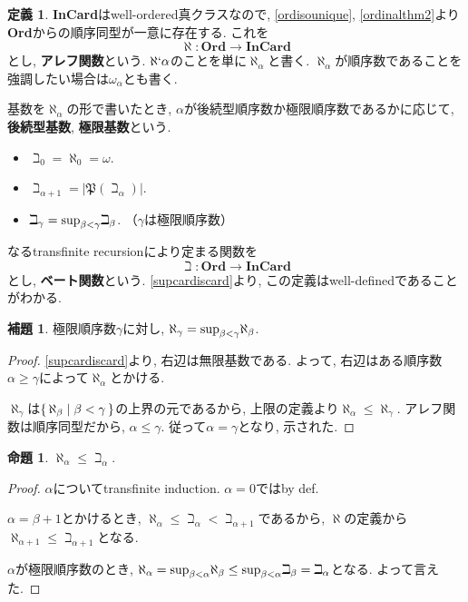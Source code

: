 \documentclass[a4paper, twoside]{bxjsarticle}
\newcommand{\abs}[1]{\left\lvert#1\right\rvert}
\theoremstyle{definition}
\newtheorem{prop}[thm]{命題}
\newtheorem{defn}[thm]{定義}
\newtheorem{lem}[thm]{補題}
\begin{document}
        \begin{defn}
            \textbf{InCard}はwell-ordered真クラスなので, \ref{ordisounique}, \ref{ordinalthm2}より\textbf{Ord}からの順序同型が一意に存在する. これを\[\aleph\colon \textbf{Ord}\to\textbf{InCard}\]とし, \textbf{アレフ関数}という. $\aleph`\alpha$のことを単に$\aleph_\alpha$と書く. $\aleph_\alpha$が順序数であることを強調したい場合は$\omega_\alpha$とも書く. 
            
            基数を$\aleph_\alpha$の形で書いたとき, $\alpha$が後続型順序数か極限順序数であるかに応じて, \textbf{後続型基数}, \textbf{極限基数}という.
            
            \begin{itemize}
                \item $\beth_0 = \aleph_0 =\omega$.
                \item $\beth_{\alpha+1}=\abs{\mathfrak{P}(\beth_\alpha)}$.
                \item $\beth_\gamma = {\rm sup}_{\beta<\gamma}\beth_\beta$. （$\gamma$は極限順序数）
            \end{itemize}
            なるtransfinite recursionにより定まる関数を\[\beth\colon \textbf{Ord}\to \textbf{InCard}\]とし, \textbf{ベート関数}という. \ref{supcardiscard}より, この定義はwell-definedであることがわかる.
        \end{defn}
        \begin{lem}
            極限順序数$\gamma$に対し, $\aleph_\gamma = {\rm sup}_{\beta<\gamma}\aleph_\beta$.
        \end{lem}
        \begin{proof}
            \ref{supcardiscard}より, 右辺は無限基数である. よって, 右辺はある順序数$\alpha\geq\gamma$によって$\aleph_\alpha$とかける.
            
            $\aleph_\gamma$は$\set{\aleph_\beta|\beta<\gamma}$の上界の元であるから, 上限の定義より$\aleph_\alpha\leq\aleph_\gamma$. アレフ関数は順序同型だから, $\alpha\leq\gamma$. 従って$\alpha=\gamma$となり, 示された.
        \end{proof}
        \begin{prop}
            $\aleph_\alpha\leq\beth_\alpha$.
        \end{prop}
        \begin{proof}
            $\alpha$についてtransfinite induction. $\alpha=0$ではby def.
            
            $\alpha=\beta+1$とかけるとき, $\aleph_\alpha\leq\beth_\alpha<\beth_{\alpha+1}$であるから, $\aleph$の定義から $\aleph_{\alpha+1}\leq\beth_{\alpha+1}$となる.
            
            $\alpha$が極限順序数のとき, $\aleph_\alpha={\rm sup}_{\beta<\alpha}\aleph_\beta\leq{\rm sup}_{\beta<\alpha}\beth_\beta=\beth_\alpha$となる. よって言えた.
        \end{proof}
\end{document}
